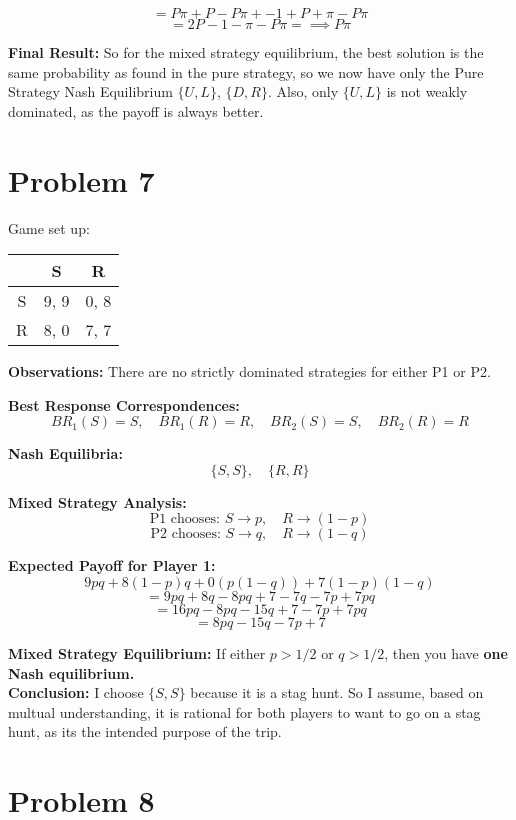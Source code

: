 \documentclass{article}
\begin{document}
\[
= P\pi + P - P\pi + -1 + P + \pi - P\pi
\]
\[
= 2P - 1 - \pi - P\pi =\implies P\pi
\]

\textbf{Final Result:}
So for the mixed strategy equilibrium, the best solution is the same probability as found in the pure strategy, so we now have only the Pure Strategy Nash Equilibrium $\{ U, L\}$,  $\{ D, R\}$. Also, only $\{ U, L\}$ is not weakly dominated, as the payoff is always better.

\section{Problem 7}
Game set up: 

\begin{table}[H]
\centering
\begin{tabular}{c|c|c}
    & S & R \\ \hline
S   & 9, 9 & 0, 8 \\
R   & 8, 0 & 7, 7 \\
\end{tabular}
\end{table}

\textbf{Observations:} There are no strictly dominated strategies for either P1 or P2. 

\textbf{Best Response Correspondences:}
\[
BR_1(S) = S, \quad BR_1(R) = R, \quad BR_2(S) = S, \quad BR_2(R) = R
\]

\textbf{Nash Equilibria:}
\[
\{S, S\}, \quad \{R, R\}
\]

\textbf{Mixed Strategy Analysis:}
\[
\text{P1 chooses: } S \to p, \quad R \to (1 - p)
\]
\[
\text{P2 chooses: } S \to q, \quad R \to (1 - q)
\]

\textbf{Expected Payoff for Player 1:}
\[
9p q + 8(1 - p)q + 0(p(1 - q)) + 7(1 - p)(1 - q)
\]
\[
= 9pq + 8q - 8pq + 7 - 7q - 7p + 7pq
\]
\[
= 16pq - 8pq - 15q + 7 - 7p + 7pq
\]
\[
= 8pq - 15q - 7p + 7
\]

\noindent \textbf{Mixed Strategy Equilibrium:}
If either $p > 1/2$ or $q > 1/2$, then you have \textbf{one Nash equilibrium.}
\\
\noindent  \textbf{Conclusion:} I choose $\{S, S\}$ because it is a stag hunt. So I assume, based on multual understanding, it is rational for both players to want to go on a stag hunt, as its the intended purpose of the trip. 

\section{Problem 8}
\end{document}
